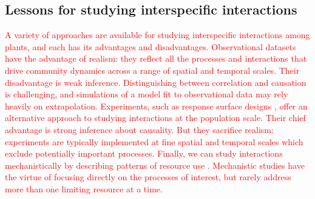 \documentclass[11pt]{article}
\newcommand{\new}{\textcolor{red}}
\begin{document}
\begin{doublespacing}

\subsection*{Lessons for studying interspecific interactions}

\new{A variety of approaches are available for studying interspecific interactions among plants, and each has its advantages and disadvantages. Observational datasets have the advantage of realism: they reflect all the processes and interactions that drive community dynamics across a range of spatial and temporal scales. Their disadvantage is weak inference. Distinguishing between correlation and causation is challenging, and simulations of a model fit to observational data may rely heavily on extrapolation. Experiments, such as response surface designs \citep{Inouye2001}, offer an alternative approach to studying interactions at the population scale. Their chief advantage is strong inference about causality. But they sacrifice realism: experiments are typically implemented at fine spatial and temporal scales which exclude potentially important processes.  Finally, we can study interactions mechanistically by describing patterns of resource use \citep{Dybzinski2007,Silvertown1999}. Mechanistic studies have the virtue of focusing  directly on the processes of interest, but rarely address more than one limiting resource at a time. }


\end{doublespacing}
\end{document}
